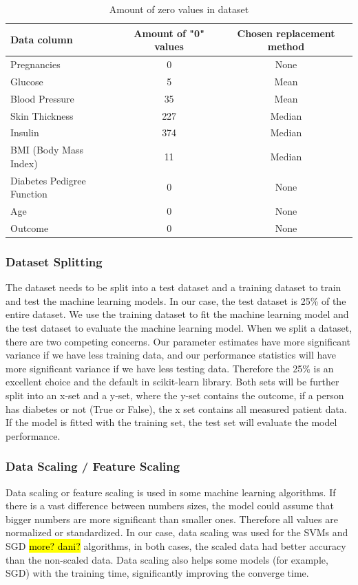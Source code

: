 \documentclass[11pt]{article}
\renewcommand{\arraystretch}{1.3}
\begin{document}
	\begin{table}[H]
		\renewcommand{\arraystretch}{1.3}
		\centering
		\begin{tabular}{lcc}
			Data column & Amount of "0" values & Chosen replacement method \\
			\toprule
			Pregnancies          &         0 &  None \\
 			Glucose              &         5 & Mean \\
			Blood Pressure        &        35 & Mean \\
			Skin Thickness        &       227 & Median\\
			Insulin              &       374  & Median\\
			BMI (Body Mass Index) &        11 & Median \\
			Diabetes Pedigree Function  &    0 & None \\
			Age                  &         0 & None \\
			Outcome              &         0 & None \\
		\end{tabular}
		\caption{Amount of zero values in dataset}
		\label{tab:nullValues}
	\end{table}
	\subsubsection{Dataset Splitting}
	The dataset needs to be split into a test dataset and a training dataset to train and test the machine learning models. In our case, the test dataset is 25\% of the entire dataset. We use the training dataset to fit the machine learning model and the test dataset to evaluate the machine learning model.  When we split a dataset, there are two competing concerns. Our parameter estimates have more significant variance if we have less training data, and our performance statistics will have more significant variance if we have less testing data. Therefore the 25\% is an excellent choice and the default in scikit-learn library. 
	\medbreak
	Both sets will be further split into an x-set and a y-set, where the y-set contains the outcome, if a person has diabetes or not (True or False), the x set contains all measured patient data. If the model is fitted with the training set, the test set will evaluate the model performance.
	\subsubsection{Data Scaling / Feature Scaling}
	Data scaling or feature scaling is used in some machine learning algorithms. If there is a vast difference between numbers sizes, the model could assume that bigger numbers are more significant than smaller ones. Therefore all values are normalized or standardized.
	\medbreak
	In our case, data scaling was used for the SVMs and SGD \hl{more? dani?} algorithms, in both cases, the scaled data had better accuracy than the non-scaled data. Data scaling also helps some models (for example, SGD) with the training time, significantly improving the converge time.
	
\end{document}
